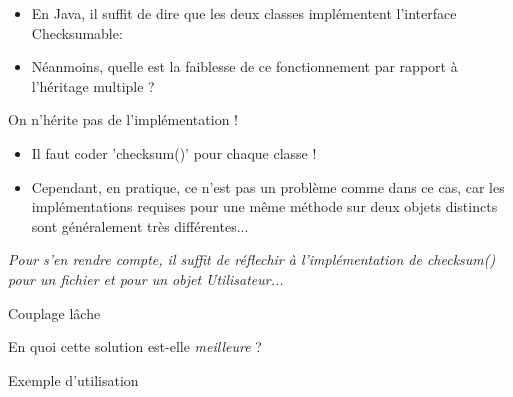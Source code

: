 \documentclass[handout]{beamer}
\begin{document}
\begin{frame}
	\begin{itemize}
	\item En Java, il suffit de dire que les deux classes implémentent l'interface Checksumable:
	
	\item Néanmoins, quelle est la faiblesse de ce fonctionnement par rapport à l'héritage multiple ?
	\end{itemize}
\end{frame}

\begin{frame}
	\begin{block}{On n'hérite pas de l'implémentation !}
	\end{block}
	
	\begin{itemize}
	\item Il faut coder 'checksum()' pour chaque classe !
	\item Cependant, en pratique, ce n'est pas un problème comme dans ce cas, car les implémentations requises pour une même méthode sur deux objets distincts sont généralement très différentes...
	\end{itemize}
	
	\begin{center}
		\textit{Pour s'en rendre compte, il suffit de réflechir à l'implémentation de checksum() 
		pour un fichier et pour un objet Utilisateur...}
	\end{center}
\end{frame}

\begin{frame}
	\begin{block}{Couplage lâche}
		
	\end{block}
	\begin{center}
		En quoi cette solution est-elle \textit{meilleure} ?
	\end{center}
\end{frame}
\begin{frame}
	\begin{block}{Exemple d'utilisation}
		
	\end{block}
\end{frame}
\end{document}

